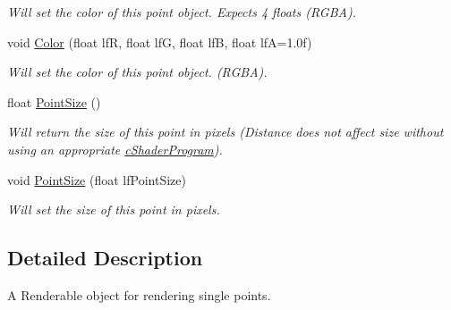 \begin{DoxyCompactItemize}
\begin{DoxyCompactList}\small\item\em Will set the color of this point object. Expects 4 floats (RGBA). \end{DoxyCompactList}\item 
\hypertarget{classc_point_aa6f3c2383b2bc6b41b4ea854c04f73fc}{
void \hyperlink{classc_point_aa6f3c2383b2bc6b41b4ea854c04f73fc}{Color} (float lfR, float lfG, float lfB, float lfA=1.0f)}
\label{classc_point_aa6f3c2383b2bc6b41b4ea854c04f73fc}

\begin{DoxyCompactList}\small\item\em Will set the color of this point object. (RGBA). \end{DoxyCompactList}\item 
\hypertarget{classc_point_a1fe0ddb9d044eabfadbaa4da74b65e50}{
float \hyperlink{classc_point_a1fe0ddb9d044eabfadbaa4da74b65e50}{PointSize} ()}
\label{classc_point_a1fe0ddb9d044eabfadbaa4da74b65e50}

\begin{DoxyCompactList}\small\item\em Will return the size of this point in pixels (Distance does not affect size without using an appropriate \hyperlink{classc_shader_program}{cShaderProgram}). \end{DoxyCompactList}\item 
\hypertarget{classc_point_a13875c5036a0449b5f37d6edfb312b82}{
void \hyperlink{classc_point_a13875c5036a0449b5f37d6edfb312b82}{PointSize} (float lfPointSize)}
\label{classc_point_a13875c5036a0449b5f37d6edfb312b82}

\begin{DoxyCompactList}\small\item\em Will set the size of this point in pixels. \end{DoxyCompactList}\end{DoxyCompactItemize}


\subsection{Detailed Description}
A Renderable object for rendering single points. 